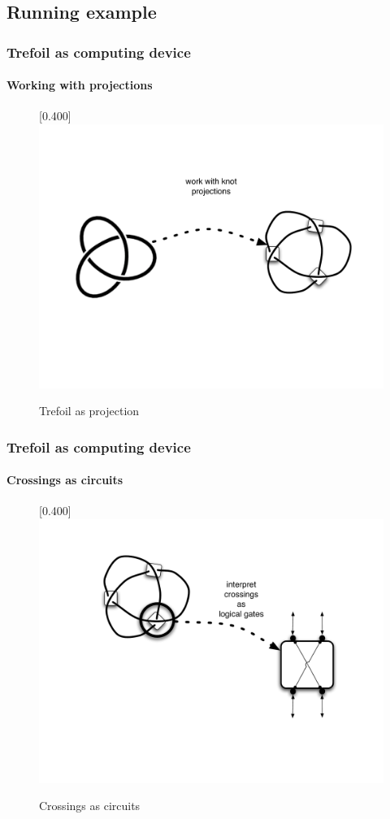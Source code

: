 \documentclass{beamer}
\begin{document}
\subsection{Running example}

\begin{frame}
  \frametitle{Trefoil as computing device}
  \framesubtitle{Working with projections}
  \begin{figure}[tbp]
    \centering
    \scalebox{0.40}[0.400]{\includegraphics[viewport=20 200 810 480]{TrefoilMethodIllustrationStepOne21072006}}
    \caption{ Trefoil as projection }
\end{figure}
\end{frame}

\begin{frame}
  \frametitle{Trefoil as computing device}
  \framesubtitle{Crossings as circuits}
  \begin{figure}[tbp]
    \centering
    \scalebox{0.40}[0.400]{\includegraphics[viewport=30 200 810 500]{TrefoilMethodIllustrationStepTwo21072006}}
    \caption{ Crossings as circuits }
\end{figure}
\end{frame}
\end{document}
